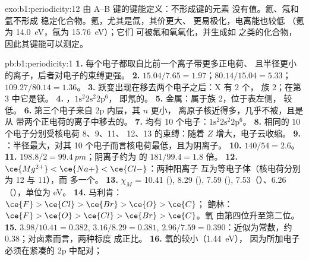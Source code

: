 \begin{solution}{exo:b1:periodicity:12}
由 A--B 键的键能定义：不形成键的元素
没有值。氦、氖和氩不形成
稳定化合物。氪，尤其是氙，其价更大、
更易极化，电离能也较低
（氪为 \qty{14.0}{eV}，氩为 \qty{15.76}{eV}）；它们
可被氟和氧氧化，并生成如  之类的化合物，
因此其键能可以测定。
\end{solution}

\begin{solution}{pb:b1:periodicity:1}
\textbf{1.} 每个电子都取自比前一个离子带更多正电荷、
且半径更小的离子，后者对电子的束缚更强。
\textbf{2.} $15.04/7.65 = 1.97$；$80.14/15.04 = 5.33$；$109.27/80.14 = 1.36$。
\textbf{3.} 跃变出现在移去两个电子之后：X 有 2 个，
族 2；在第 3 中它是镁。
\textbf{4.} ，$1\text{s}^2 2\text{s}^2 2\text{p}^6$，
即氖的。
\textbf{5.} 金属：属于族 2，位于表左侧，
较低。
\textbf{6.} 第三个电子来自 2p 内层，其 $n$ 更小，
离原子核近得多，几乎不被，且是从
带两个正电荷的离子中移去的。
\textbf{7.} 均有 10 个电子：$1\text{s}^2 2\text{s}^2 2\text{p}^6$。
\textbf{8.} 相同的 10 个电子分别受核电荷 8、9、11、
12、13 的束缚：随着 $Z$ 增大，电子云收缩。
\textbf{9.} ：半径最大，对其
10 个电子而言核电荷最低，且为阴离子。
\textbf{10.} $140/54 = 2.6$。
\textbf{11.} $198.8/2 = \qty{99.4}{pm}$；阴离子约为
的 $181/99.4 = 1.8$ 倍。
\textbf{12.} $\ce{Mg^{2+}} < \ce{Na+} < \ce{Cl-}$：两种阳离子
互为等电子体（核电荷分别为 12 与 11），而  多一个。
\textbf{13.} $\chi_M$ = 10.41 (), 8.29 (), 7.59 (),
7.53（）、6.26（），单位为 eV。
\textbf{14.} 马利肯：$\ce{F} > \ce{Cl} > \ce{Br} > \ce{O} > \ce{C}$；
鲍林：$\ce{F} > \ce{O} > \ce{Cl} > \ce{Br} > \ce{C}$。氧
由第四位升至第二位。
\textbf{15.} $3.98/10.41 = 0.382$, $3.16/8.29 = 0.381$, $2.96/7.59 =
0.390$：近似为常数，约 0.38；对卤素而言，两种标度
成正比。
\textbf{16.} 氧的较小（\qty{1.44}{eV}），
因为所加电子必须在紧凑的 2p 中配对；

\end{solution}
